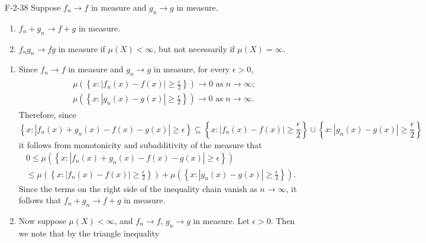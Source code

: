 \documentclass{article}
\begin{document}
	\begin{prb}{F-2-38}
		Suppose $f_{n} \to f$ in measure and $g_{n} \to g$ in measure. \vspace{-0.25cm} 
		\begin{enumerate}[itemsep =-2pt,label = (\alph{*})]
			\item $f_{n} + g_{n} \to f + g$ in measure. 
			\item $f_{n}g_{n} \to fg$ in measure if $\mu(X) < \infty$, but not necessarily if $\mu(X) = \infty$. 
		\end{enumerate}
	\end{prb}
	\begin{enumerate}[itemsep =-2pt, label = (\alph{*})]
		\item Since $f_{n} \to f$ in measure and $g_{n} \to g$ in measure, for every $\epsilon > 0$, 
		\begin{align}
			\begin{split}
				&\mu\left(\left\{x: |f_{n}(x) - f(x)|\geq \frac{\epsilon}{2}\right\}\right) \to 0 \text{ as } n \to \infty;  \\
				&\mu\left(\left\{x: |g_{n}(x) - g(x)|\geq \frac{\epsilon}{2}\right\}\right) \to 0 \text{ as } n \to \infty. 
			\end{split}
		\end{align}
		Therefore, since 
		\begin{equation}
			\left\{x: |f_{n}(x) + g_{n}(x) - f(x) - g(x)| \geq \epsilon \right\} \subseteq \left\{x: |f_{n}(x) - f(x)|\geq \frac{\epsilon}{2}\right\} \cup \left\{x: |g_{n}(x) - g(x)|\geq \frac{\epsilon}{2}\right\}
		\end{equation}
		it follows from monotonicity and subadditivity of the measure that 
		\begin{multline}
			0 \leq \mu\left(\left\{x: |f_{n}(x) + g_{n}(x) - f(x) - g(x)| \geq \epsilon \right\}\right)  \\ \leq \mu\left(\left\{x: |f_{n}(x) - f(x)|\geq \frac{\epsilon}{2}\right\}\right) + \mu\left(\left\{x: |g_{n}(x) - g(x)|\geq \frac{\epsilon}{2}\right\}\right). 
		\end{multline}
		Since the terms on the right side of the inequality chain vanish as $n \to \infty$, it follows that $f_{n} + g_{n} \to f + g$ in measure. 
		\item Now suppose $\mu(X) < \infty$, and $f_{n} \to f$, $g_{n} \to g$ in measure. Let $\epsilon > 0$. Then we note that by the triangle inequality
		\begin{align}
			\begin{split}

\end{split}
\end{align}
\end{enumerate}
\end{document}
